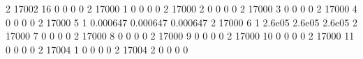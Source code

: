 \documentclass[letterpaper,10pt,english,openany,oneside]{sphinxmanual}
\begin{document}
\begin{sphinxVerbatim}[commandchars=\\\{\}]
     2 \textbar{}       17002 \textbar{}    16 \textbar{}           0 \textbar{}          0 \textbar{}        0 \textbar{}        0 \textbar{}        \textbar{}        \textbar{}        \textbar{}
     2 \textbar{}       17000 \textbar{}     1 \textbar{}           0 \textbar{}          0 \textbar{}        0 \textbar{}        0 \textbar{}        \textbar{}        \textbar{}        \textbar{}
     2 \textbar{}       17000 \textbar{}     2 \textbar{}           0 \textbar{}          0 \textbar{}        0 \textbar{}        0 \textbar{}        \textbar{}        \textbar{}        \textbar{}
     2 \textbar{}       17000 \textbar{}     3 \textbar{}           0 \textbar{}          0 \textbar{}        0 \textbar{}        0 \textbar{}        \textbar{}        \textbar{}        \textbar{}
     2 \textbar{}       17000 \textbar{}     4 \textbar{}           0 \textbar{}          0 \textbar{}        0 \textbar{}        0 \textbar{}        \textbar{}        \textbar{}        \textbar{}
     2 \textbar{}       17000 \textbar{}     5 \textbar{}           1 \textbar{}   0.000647 \textbar{} 0.000647 \textbar{} 0.000647 \textbar{}        \textbar{}        \textbar{}        \textbar{}
     2 \textbar{}       17000 \textbar{}     6 \textbar{}           1 \textbar{}    2.6e\PYGZhy{}05 \textbar{}  2.6e\PYGZhy{}05 \textbar{}  2.6e\PYGZhy{}05 \textbar{}        \textbar{}        \textbar{}        \textbar{}
     2 \textbar{}       17000 \textbar{}     7 \textbar{}           0 \textbar{}          0 \textbar{}        0 \textbar{}        0 \textbar{}        \textbar{}        \textbar{}        \textbar{}
     2 \textbar{}       17000 \textbar{}     8 \textbar{}           0 \textbar{}          0 \textbar{}        0 \textbar{}        0 \textbar{}        \textbar{}        \textbar{}        \textbar{}
     2 \textbar{}       17000 \textbar{}     9 \textbar{}           0 \textbar{}          0 \textbar{}        0 \textbar{}        0 \textbar{}        \textbar{}        \textbar{}        \textbar{}
     2 \textbar{}       17000 \textbar{}    10 \textbar{}           0 \textbar{}          0 \textbar{}        0 \textbar{}        0 \textbar{}        \textbar{}        \textbar{}        \textbar{}
     2 \textbar{}       17000 \textbar{}    11 \textbar{}           0 \textbar{}          0 \textbar{}        0 \textbar{}        0 \textbar{}        \textbar{}        \textbar{}        \textbar{}
     2 \textbar{}       17004 \textbar{}     1 \textbar{}           0 \textbar{}          0 \textbar{}        0 \textbar{}        0 \textbar{}        \textbar{}        \textbar{}        \textbar{}
     2 \textbar{}       17004 \textbar{}     2 \textbar{}           0 \textbar{}          0 \textbar{}        0 \textbar{}        0 \textbar{}        \textbar{}        \textbar{}        \textbar{}

\end{sphinxVerbatim}
\end{document}
